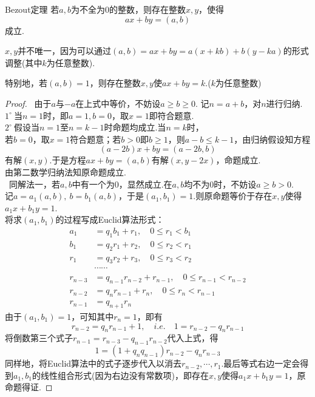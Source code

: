 \documentclass[lang=cn, zihao=5]{elegantbook}
\newcommand{\sw}[1]{\boxed{\text{解法 #1}} \ }
\newcommand{\buzhou}[1]{$#1^{\circ} \ $}
\begin{document}
\begin{theorem}{Bezout定理}
	若$a,b$为不全为$0$的整数，则存在整数$x,y$，使得$$ax+by=(a,b)$$成立.
\end{theorem}
\begin{remark}
	$x,y$并不唯一，因为可以通过$(a,b)=ax+by=a(x+kb)+b(y-ka)$的形式调整(其中$k$为任意整数).
\end{remark}
\begin{remark}
	特别地，若$(a,b)=1$，则存在整数$x,y$使$ax+by=k$.($k$为任意整数)
\end{remark}
\begin{proof} %
	\sw{一}由于$a$与$-a$在上式中等价，不妨设$a \geq b \geq 0$. 记$n=a+b$，对$n$进行归纳. \\
	\buzhou{1}当$n=1$时，即$a=1,b=0$，取$x=1$即符合题意. \\
	\buzhou{2}假设当$n=1$至$n=k-1$时命题均成立.当$n=k$时， \\
	若$b=0$，取$x=1$符合题意；若$b > 0$即$b \geq 1$，则$a-b \leq k-1$，由归纳假设知方程$$(a-2b)x+by=(a-2b,b)$$
	有解$(x,y)$.于是方程$ax+by=(a,b)$有解$(x,y-2x)$，命题成立. \\
	由第二数学归纳法知原命题成立. \\
	\sw{二}同解法一，若$a,b$中有一个为$0$，显然成立.在$a,b$均不为$0$时，不妨设$a \geq b >0$. \\
	记$a=a_1(a,b),~b=b_1(a,b)$，于是$(a_1,b_1)=1$.则原命题等价于存在$x,y$使得$a_1x+b_1y=1$. \\
	将求$(a_1,b_1)$的过程写成Euclid算法形式：
	\begin{align*}
		a_1 &= q_1b_1+r_1, \quad 0 \leq r_1 < b_1 \\
		b_1 &= q_2r_1+r_2, \quad 0 \leq r_2 < r_1 \\
		r_1 &= q_3r_2+r_3, \quad 0 \leq r_3 < r_2 \\
		& \cdots \cdots \\
		r_{n-3} &= q_{n-1}r_{n-2} + r_{n-1}, \quad 0 \leq r_{n-1} < r_{n-2} \\
		r_{n-2} &= q_nr_{n-1} + r_n, \quad 0 \leq r_n < r_{n-1} \\
		r_{n-1} &= q_{n+1}r_n
	\end{align*}
	由于$(a_1,b_1)=1$，可知其中$r_n=1$，即有$$r_{n-2} = q_nr_{n-1} + 1,\quad i.e. \quad 1=r_{n-2} - q_nr_{n-1}$$
	将倒数第三个式子$r_{n-1} = r_{n-3} - q_{n-1}r_{n-2}$代入上式，得$$1 = (1+q_nq_{n-1})r_{n-2} - q_nr_{n-3}$$
	同样地，将Euclid算法中的式子逐步代入以消去$r_{n-2},\cdots ,r_1$.最后等式右边一定会得到$a_1,b_1$的线性组合形式(因为右边没有常数项)，即存在$x,y$使得$a_1x+b_1y=1$，原命题得证.
\end{proof}
\end{document}
